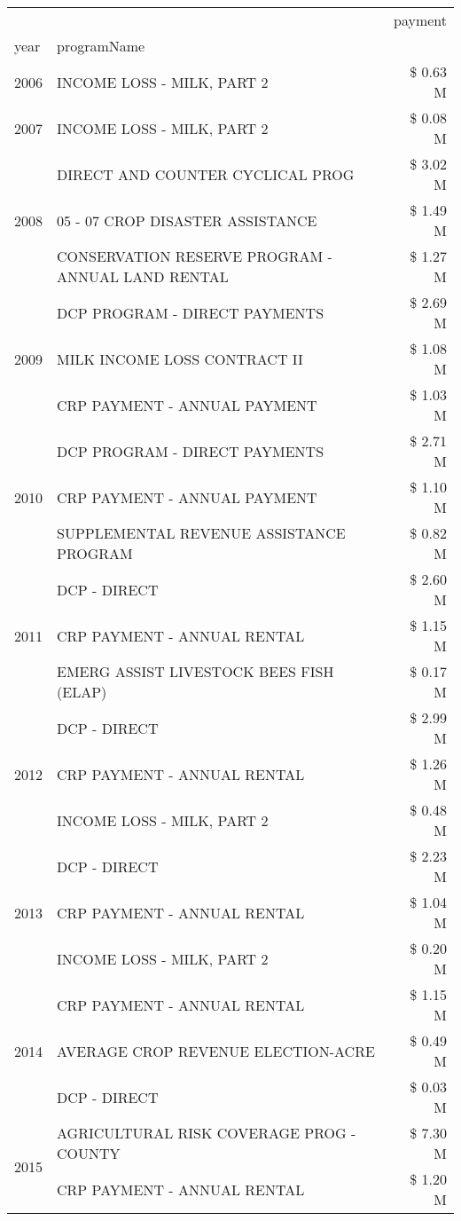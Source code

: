 \begin{tabular}{llr}
\toprule
 &  & payment \\
year & programName &  \\
\midrule
2006 & INCOME LOSS - MILK, PART 2 & \$ 0.63 M \\
\cline{1-3}
2007 & INCOME LOSS - MILK, PART 2 & \$ 0.08 M \\
\cline{1-3}
\multirow[t]{3}{*}{2008} & DIRECT AND COUNTER CYCLICAL PROG & \$ 3.02 M \\
 & 05 - 07 CROP DISASTER ASSISTANCE & \$ 1.49 M \\
 & CONSERVATION RESERVE PROGRAM - ANNUAL LAND RENTAL & \$ 1.27 M \\
\cline{1-3}
\multirow[t]{3}{*}{2009} & DCP PROGRAM - DIRECT PAYMENTS & \$ 2.69 M \\
 & MILK INCOME LOSS CONTRACT II & \$ 1.08 M \\
 & CRP PAYMENT - ANNUAL PAYMENT & \$ 1.03 M \\
\cline{1-3}
\multirow[t]{3}{*}{2010} & DCP PROGRAM - DIRECT PAYMENTS & \$ 2.71 M \\
 & CRP PAYMENT - ANNUAL PAYMENT & \$ 1.10 M \\
 & SUPPLEMENTAL REVENUE ASSISTANCE PROGRAM & \$ 0.82 M \\
\cline{1-3}
\multirow[t]{3}{*}{2011} & DCP - DIRECT & \$ 2.60 M \\
 & CRP PAYMENT - ANNUAL RENTAL & \$ 1.15 M \\
 & EMERG ASSIST LIVESTOCK BEES FISH (ELAP) & \$ 0.17 M \\
\cline{1-3}
\multirow[t]{3}{*}{2012} & DCP - DIRECT & \$ 2.99 M \\
 & CRP PAYMENT - ANNUAL RENTAL & \$ 1.26 M \\
 & INCOME LOSS - MILK, PART 2 & \$ 0.48 M \\
\cline{1-3}
\multirow[t]{3}{*}{2013} & DCP - DIRECT & \$ 2.23 M \\
 & CRP PAYMENT - ANNUAL RENTAL & \$ 1.04 M \\
 & INCOME LOSS - MILK, PART 2 & \$ 0.20 M \\
\cline{1-3}
\multirow[t]{3}{*}{2014} & CRP PAYMENT - ANNUAL RENTAL & \$ 1.15 M \\
 & AVERAGE CROP REVENUE ELECTION-ACRE & \$ 0.49 M \\
 & DCP - DIRECT & \$ 0.03 M \\
\cline{1-3}
\multirow[t]{3}{*}{2015} & AGRICULTURAL RISK COVERAGE PROG - COUNTY & \$ 7.30 M \\
 & CRP PAYMENT - ANNUAL RENTAL & \$ 1.20 M \\

\end{tabular}
